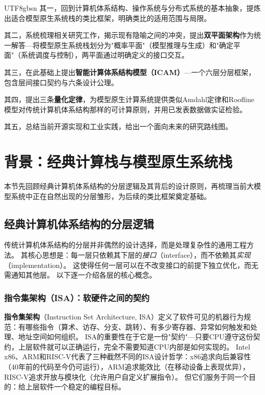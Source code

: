 \documentclass[11pt,a4paper]{article}
\begin{document}
\begin{CJK*}{UTF8}{gbsn}
其一，回到计算机体系结构、操作系统与分布式系统的基本抽象，提炼出适合模型原生系统栈的类比框架，明确类比的适用范围与局限。

其二，系统梳理相关研究工作，揭示现有隐喻之间的冲突，提出\textbf{双平面架构}作为统一解答---将模型原生系统栈划分为"概率平面"（模型推理与生成）和"确定平面"（系统调度与控制），两平面通过明确定义的接口交互。

其三，在此基础上提出\textbf{智能计算体系结构模型（ICAM）}---一个六层分层框架，包含层间接口契约与六条设计公理。

其四，提出三条\textbf{量化定律}，为模型原生计算系统提供类似Amdahl定律和Roofline模型对传统计算机体系结构那样的可计算原则，并用已发表数据做实证检验。

其五，总结当前开源实现和工业实践，给出一个面向未来的研究路线图。

\section{背景：经典计算栈与模型原生系统栈}
\label{sec:background}

本节先回顾经典计算机体系结构的分层逻辑及其背后的设计原则，再梳理当前大模型系统中正在自然出现的分层雏形，为后续的类比框架奠定基础。

\subsection{经典计算机体系结构的分层逻辑}

传统计算机体系结构的分层并非偶然的设计选择，而是处理复杂性的通用工程方法\cite{hennessy2017quantitative}。
其核心思想是：每一层只依赖其下层的\emph{接口}（interface），而不依赖其\emph{实现}（implementation）。
这使得任何一层可以在不改变接口的前提下独立优化，而无需通知其他层。
以下逐一介绍各层的核心概念。

\subsubsection{指令集架构（ISA）：软硬件之间的契约}

\textbf{指令集架构}（Instruction Set Architecture, ISA）定义了软件可见的机器行为规范：有哪些指令（算术、访存、分支、跳转）、有多少寄存器、异常如何触发和处理、地址空间如何组织。
ISA的重要性在于它是一份"契约"---只要CPU遵守这份契约，上层软件就可以正确运行，完全不需要知道CPU内部是如何实现的。
Intel x86、ARM和RISC-V代表了三种截然不同的ISA设计哲学\cite{intel_sdm_2026,riscv_spec_2026}：x86追求向后兼容性（40年前的代码至今仍可运行），ARM追求能效比（在移动设备上表现优异），RISC-V追求开放与模块化（允许用户自定义扩展指令）。
但它们服务于同一个目的：给上层软件一个稳定的编程目标。


\end{CJK*}
\end{document}
